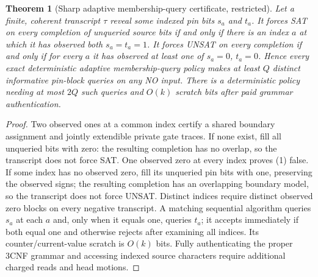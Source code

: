 \documentclass[11pt]{article}
\newtheorem{theorem}{Theorem}
\begin{document}
\begin{theorem}[Sharp adaptive membership-query certificate, restricted]
Let a finite, coherent transcript $\tau$ reveal some indexed pin bits $s_a$ and $t_a$. It forces SAT on \emph{every} completion of unqueried source bits if and only if there is an index $a$ at which it has observed both $s_a=t_a=1$. It forces UNSAT on every completion if and only if for \emph{every} $a$ it has observed at least one of $s_a=0$, $t_a=0$. Hence every exact deterministic adaptive membership-query policy makes at least $Q$ distinct informative pin-block queries on any NO input. There is a deterministic policy needing at most $2Q$ such queries and $O(k)$ scratch bits after paid grammar authentication.
\end{theorem}
\begin{proof}
Two observed ones at a common index certify a shared boundary assignment and jointly extendible private gate traces. If none exist, fill all unqueried bits with zero: the resulting completion has no overlap, so the transcript does not force SAT. One observed zero at every index proves (1) false. If some index has no observed zero, fill its unqueried pin bits with one, preserving the observed signs; the resulting completion has an overlapping boundary model, so the transcript does not force UNSAT. Distinct indices require distinct observed zero blocks on every negative transcript. A matching sequential algorithm queries $s_a$ at each $a$ and, only when it equals one, queries $t_a$; it accepts immediately if both equal one and otherwise rejects after examining all indices. Its counter/current-value scratch is $O(k)$ bits. Fully authenticating the proper 3CNF grammar and accessing indexed source characters require additional charged reads and head motions.
\end{proof}
\end{document}

